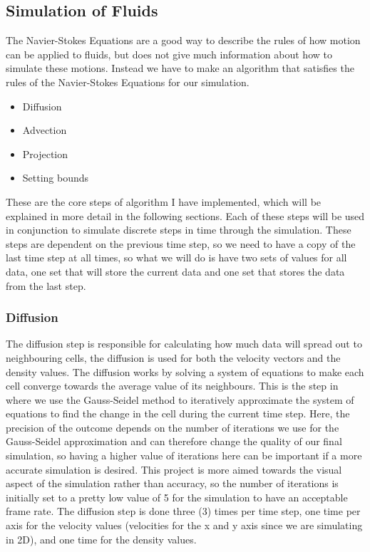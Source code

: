 \documentclass{article}
\begin{document}
\begin{multicols}{2}
\subsection{Simulation of Fluids}
The Navier-Stokes Equations are a good way to describe the rules of how motion can be applied to fluids, but does not give much information about how to simulate these motions. Instead we have to make an algorithm that satisfies the rules of the Navier-Stokes Equations for our simulation.
\begin{itemize}
    \item Diffusion
    \item Advection
    \item Projection
    \item Setting bounds
\end{itemize}
These are the core steps of algorithm I have implemented, which will be explained in more detail in the following sections. Each of these steps will be used in conjunction to simulate discrete steps in time through the simulation. These steps are dependent on the previous time step, so we need to have a copy of the last time step at all times, so what we will do is have two sets of values for all data, one set that will store the current data and one set that stores the data from the last step.

\subsubsection{Diffusion}
The diffusion step is responsible for calculating how much data will spread out to neighbouring cells, the diffusion is used for both the velocity vectors and the density values. The diffusion works by solving a system of equations to make each cell converge towards the average value of its neighbours. This is the step in where we use the Gauss-Seidel method to iteratively approximate the system of equations to find the change in the cell during the current time step. Here, the precision of the outcome depends on the number of iterations we use for the Gauss-Seidel approximation and can therefore change the quality of our final simulation, so having a higher value of iterations here can be important if a more accurate simulation is desired. This project is more aimed towards the visual aspect of the simulation rather than accuracy, so the number of iterations is initially set to a pretty low value of 5 for the simulation to have an acceptable frame rate. The diffusion step is done three (3) times per time step, one time per axis for the velocity values (velocities for the x and y axis since we are simulating in 2D), and one time for the density values.


\end{multicols}
\end{document}
